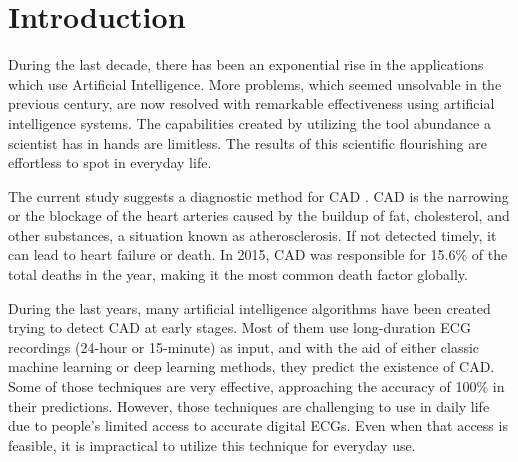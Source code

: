 \section{Introduction}
\label{sec:intro}

During the last decade, there has been an exponential rise in the applications which use Artificial Intelligence. More problems, which seemed unsolvable in the previous century, are now resolved with remarkable effectiveness using artificial intelligence systems. The capabilities created by utilizing the tool abundance a scientist has in hands are limitless. The results of this scientific flourishing are effortless to spot in everyday life.


The current study suggests a diagnostic method for CAD \cite{CAD_article}. CAD is the narrowing or the blockage of the heart arteries caused by the buildup of fat, cholesterol, and other substances, a situation known as atherosclerosis. If not detected timely, it can lead to heart failure or death. In 2015, CAD was responsible for 15.6\% of the total deaths in the year, making it the most common death factor globally.

During the last years, many artificial intelligence algorithms have been created trying to detect CAD at early stages. Most of them use long-duration ECG recordings (24-hour or 15-minute) as input, and with the aid of either classic machine learning or deep learning methods, they predict the existence of CAD.
Some of those techniques are very effective, approaching the accuracy of 100\% in their predictions. However, those techniques are challenging to use in daily life due to people's limited access to accurate digital ECGs. Even when that access is feasible, it is impractical to utilize this technique for everyday use.

